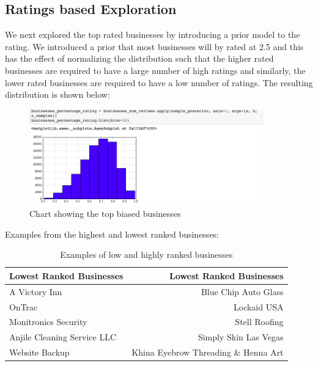 \documentclass[11pt]{article}
\begin{document}
\subsection*{Ratings based Exploration}

We next explored the top rated businesses by introducing a prior model to the rating. We introduced a prior that most businesses will by rated at 2.5 and this has the effect of normalizing the distribution such that the higher rated businesses are required to have a large number of high ratings and similarly, the lower rated businesses are required to have a low number of ratings. The resulting distribution is shown below:
\begin{figure}[H]
\centering
\includegraphics[width=0.9\textwidth]{./ac209/businessespctrating.png}
\caption{Chart showing the top biased businesses}
\end{figure}

Examples from the highest and lowest ranked businesses:
\begin{table}[H]
\centering
\caption{Examples of low and highly ranked businesses}
\label{my-label}
\begin{tabular}{|l||r|}
	\hline
	\textbf{Lowest Ranked Businesses}  & \textbf{Lowest Ranked Businesses} \\ \hline
	A Victory Inn 		 				& Blue Chip Auto Glass \\ \hline
  OnTrac&                        Lockaid USA \\ \hline
  Monitronics Security&                      Stell Roofing \\ \hline
  Anjile Cleaning Service LLC&              Simply Skin Las Vegas \\ \hline
  Website Backup& Khina Eyebrow Threading \& Henna Art \\ \hline
\end{tabular}
\end{table}
\end{document}
